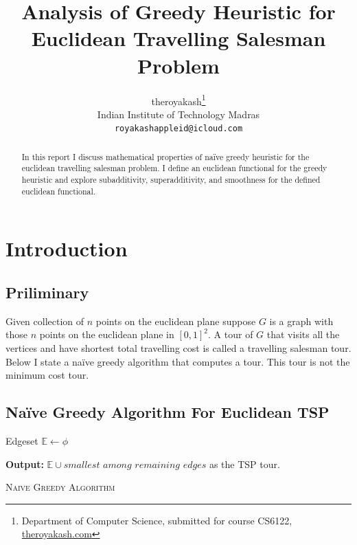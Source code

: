 \documentclass{article}
\title{Analysis of Greedy Heuristic for Euclidean Travelling Salesman Problem}
\author{
    theroyakash\thanks{\textsf{Department of Computer Science, submitted for course} \textsf{CS6122}, \href{https://theroyakash.com}{\textsf{theroyakash.com}}}\\
    Indian Institute of Technology Madras \\
    \texttt{royakashappleid@icloud.com} \\
}
\theoremstyle{define}
\theoremstyle{remark}
\begin{document}
\maketitle

\begin{abstract}
    In this report I discuss mathematical properties of
    naïve greedy heuristic for the euclidean travelling salesman problem.
    I define an euclidean functional for the greedy heuristic and explore
    subadditivity, superadditivity, and smoothness for the defined
    euclidean functional.
\end{abstract}

\section{Introduction}
\subsection{Priliminary}
Given collection of $n$ points on the euclidean plane suppose $G$ is a graph
with those $n$ points on the euclidean plane in $[0,1]^2$. A tour of $G$ that
visits all the vertices and have shortest total travelling cost is called a
travelling salesman tour. Below I state a naïve greedy algorithm that computes
a tour. This tour is not the minimum cost tour.

\subsection{Naïve Greedy Algorithm For Euclidean TSP}

\begin{algorithm}[H]\label{alg:1}

    \BlankLine
    Edgeset $\mathbb{E} \gets \phi$\\

    \textbf{Output:} $\mathbb{E} \cup \textit{smallest among remaining edges}$ as the TSP tour.

    \caption{\textsc{Naive Greedy Algorithm}}
\end{algorithm}
\end{document}
